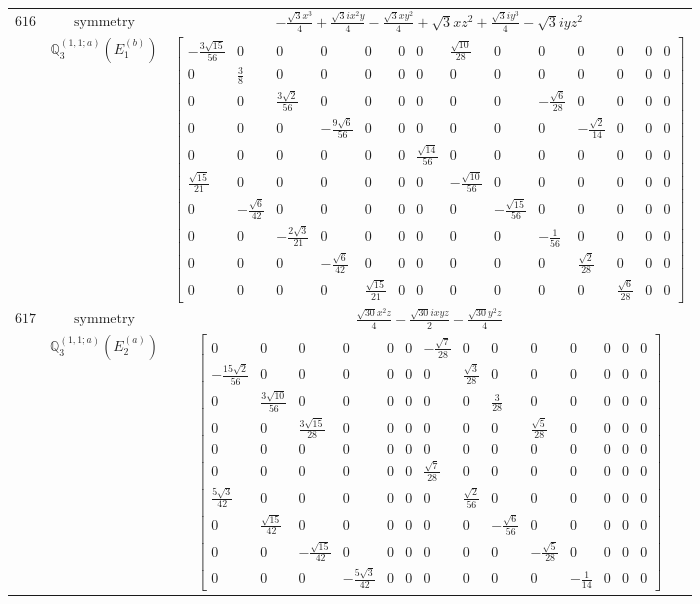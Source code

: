 \documentclass[fleqn,8pt,landscape]{jsarticle}
\begin{document}
\begin{longtable}{ccc}
$ 616 $ & $ \text{symmetry} $ & $ - \frac{\sqrt{3} x^{3}}{4} + \frac{\sqrt{3} i x^{2} y}{4} - \frac{\sqrt{3} x y^{2}}{4} + \sqrt{3} x z^{2} + \frac{\sqrt{3} i y^{3}}{4} - \sqrt{3} i y z^{2} $ \\
$  $ & $ \mathbb{Q}_{3}^{(1,1;a)}(E_{1}^{(b)}) $ & $ \begin{bmatrix} - \frac{3 \sqrt{15}}{56} & 0 & 0 & 0 & 0 & 0 & 0 & \frac{\sqrt{10}}{28} & 0 & 0 & 0 & 0 & 0 & 0 \\ 0 & \frac{3}{8} & 0 & 0 & 0 & 0 & 0 & 0 & 0 & 0 & 0 & 0 & 0 & 0 \\ 0 & 0 & \frac{3 \sqrt{2}}{56} & 0 & 0 & 0 & 0 & 0 & 0 & - \frac{\sqrt{6}}{28} & 0 & 0 & 0 & 0 \\ 0 & 0 & 0 & - \frac{9 \sqrt{6}}{56} & 0 & 0 & 0 & 0 & 0 & 0 & - \frac{\sqrt{2}}{14} & 0 & 0 & 0 \\ 0 & 0 & 0 & 0 & 0 & 0 & \frac{\sqrt{14}}{56} & 0 & 0 & 0 & 0 & 0 & 0 & 0 \\ \frac{\sqrt{15}}{21} & 0 & 0 & 0 & 0 & 0 & 0 & - \frac{\sqrt{10}}{56} & 0 & 0 & 0 & 0 & 0 & 0 \\ 0 & - \frac{\sqrt{6}}{42} & 0 & 0 & 0 & 0 & 0 & 0 & - \frac{\sqrt{15}}{56} & 0 & 0 & 0 & 0 & 0 \\ 0 & 0 & - \frac{2 \sqrt{3}}{21} & 0 & 0 & 0 & 0 & 0 & 0 & - \frac{1}{56} & 0 & 0 & 0 & 0 \\ 0 & 0 & 0 & - \frac{\sqrt{6}}{42} & 0 & 0 & 0 & 0 & 0 & 0 & \frac{\sqrt{2}}{28} & 0 & 0 & 0 \\ 0 & 0 & 0 & 0 & \frac{\sqrt{15}}{21} & 0 & 0 & 0 & 0 & 0 & 0 & \frac{\sqrt{6}}{28} & 0 & 0 \end{bmatrix} $ \\ \hline
$ 617 $ & $ \text{symmetry} $ & $ \frac{\sqrt{30} x^{2} z}{4} - \frac{\sqrt{30} i x y z}{2} - \frac{\sqrt{30} y^{2} z}{4} $ \\
$  $ & $ \mathbb{Q}_{3}^{(1,1;a)}(E_{2}^{(a)}) $ & $ \begin{bmatrix} 0 & 0 & 0 & 0 & 0 & 0 & - \frac{\sqrt{7}}{28} & 0 & 0 & 0 & 0 & 0 & 0 & 0 \\ - \frac{15 \sqrt{2}}{56} & 0 & 0 & 0 & 0 & 0 & 0 & \frac{\sqrt{3}}{28} & 0 & 0 & 0 & 0 & 0 & 0 \\ 0 & \frac{3 \sqrt{10}}{56} & 0 & 0 & 0 & 0 & 0 & 0 & \frac{3}{28} & 0 & 0 & 0 & 0 & 0 \\ 0 & 0 & \frac{3 \sqrt{15}}{28} & 0 & 0 & 0 & 0 & 0 & 0 & \frac{\sqrt{5}}{28} & 0 & 0 & 0 & 0 \\ 0 & 0 & 0 & 0 & 0 & 0 & 0 & 0 & 0 & 0 & 0 & 0 & 0 & 0 \\ 0 & 0 & 0 & 0 & 0 & 0 & \frac{\sqrt{7}}{28} & 0 & 0 & 0 & 0 & 0 & 0 & 0 \\ \frac{5 \sqrt{3}}{42} & 0 & 0 & 0 & 0 & 0 & 0 & \frac{\sqrt{2}}{56} & 0 & 0 & 0 & 0 & 0 & 0 \\ 0 & \frac{\sqrt{15}}{42} & 0 & 0 & 0 & 0 & 0 & 0 & - \frac{\sqrt{6}}{56} & 0 & 0 & 0 & 0 & 0 \\ 0 & 0 & - \frac{\sqrt{15}}{42} & 0 & 0 & 0 & 0 & 0 & 0 & - \frac{\sqrt{5}}{28} & 0 & 0 & 0 & 0 \\ 0 & 0 & 0 & - \frac{5 \sqrt{3}}{42} & 0 & 0 & 0 & 0 & 0 & 0 & - \frac{1}{14} & 0 & 0 & 0 \end{bmatrix} $ \\ \hline

\end{longtable}
\end{document}
